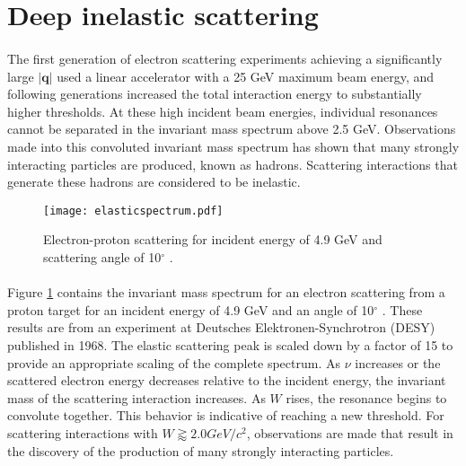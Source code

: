  
\section{Deep inelastic scattering}\label{sec:DIS}
\paragraph{}The first generation of electron scattering experiments achieving a significantly large  $|\boldsymbol{q}|$ used a linear accelerator with a 25 GeV maximum beam energy, and following generations increased the total interaction energy to substantially higher thresholds. At these high incident beam energies, individual resonances cannot be separated in the invariant mass spectrum above 2.5 GeV. Observations made into this convoluted invariant mass spectrum has shown that many strongly interacting particles are produced, known as hadrons. Scattering interactions that generate these hadrons are considered to be inelastic.
\begin{figure}[]
	\centering
	\textbf{ }\par\medskip
	\texttt{[image: elasticspectrum.pdf]}
	\caption{Electron-proton scattering for incident energy of 4.9 GeV and scattering angle of 10$^\circ$ \cite{deltaIsobar}.}
	\label{wspect}
\end{figure}
\paragraph{} Figure \ref{wspect} contains the invariant mass spectrum for an electron scattering from a proton target for an incident energy of 4.9 GeV and an angle of 10$^\circ$ \cite{deltaIsobar}. These results are from an experiment at Deutsches Elektronen-Synchrotron (DESY) published in 1968. The elastic scattering peak is scaled down by a factor of 15 to provide an appropriate scaling of the complete spectrum. As $\nu$ increases or the scattered electron energy decreases relative to the incident energy, the invariant mass of the scattering interaction increases. As $W$ rises, the resonance begins to convolute together. This behavior is indicative of reaching a new threshold. For scattering interactions with $W \gtrapprox 2.0 GeV/c^2$, observations are made that result in the discovery of the production of many strongly interacting particles. 
 
